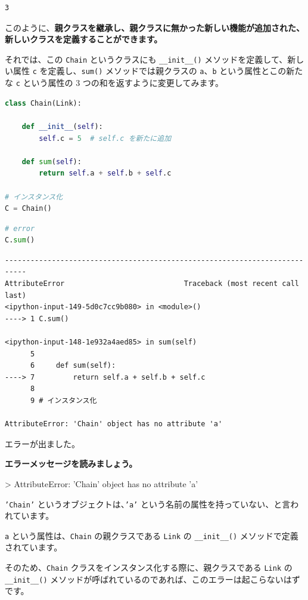 \begin{lstlisting}[style=outputcell]
3
\end{lstlisting}

このように、\textbf{親クラスを継承し、親クラスに無かった新しい機能が追加された、新しいクラスを定義することができます。}


それでは、この \texttt{Chain} というクラスにも \texttt{\_\_init\_\_()}  メソッドを定義して、新しい属性 \texttt{c} を定義し、\texttt{sum()} メソッドでは親クラスの \texttt{a}、\texttt{b} という属性とこの新たな \texttt{c} という属性の 3 つの和を返すように変更してみます。


\begin{lstlisting}[style=codecell,language=Python]
class Chain(Link):

    def __init__(self):
        self.c = 5  # self.c を新たに追加
    
    def sum(self):
        return self.a + self.b + self.c

# インスタンス化
C = Chain()
\end{lstlisting}

\begin{lstlisting}[style=codecell,language=Python]
# error
C.sum()
\end{lstlisting}

\begin{lstlisting}[style=outputcell]
---------------------------------------------------------------------------
AttributeError                            Traceback (most recent call last)
<ipython-input-149-5d0c7cc9b080> in <module>()
----> 1 C.sum()

<ipython-input-148-1e932a4aed85> in sum(self)
      5 
      6     def sum(self):
----> 7         return self.a + self.b + self.c
      8 
      9 # インスタンス化

AttributeError: 'Chain' object has no attribute 'a'
\end{lstlisting}

エラーが出ました。


\textbf{エラーメッセージを読みましょう。}


> AttributeError: 'Chain' object has no attribute 'a'


\texttt{'Chain'} というオブジェクトは、\texttt{'a'} という名前の属性を持っていない、と言われています。

\texttt{a} という属性は、\texttt{Chain} の親クラスである \texttt{Link} の \texttt{\_\_init\_\_()}  メソッドで定義されています。

そのため、\texttt{Chain} クラスをインスタンス化する際に、親クラスである \texttt{Link} の \texttt{\_\_init\_\_()}  メソッドが呼ばれているのであれば、このエラーは起こらないはずです。

